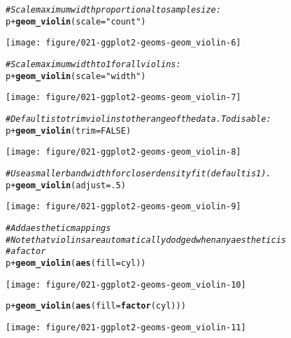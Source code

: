 \documentclass[a4paper,titlepage]{tufte-handout}\usepackage[]{graphicx}\usepackage[]{color}
\makeatletter
\def\maxwidth{ %
  \ifdim\Gin@nat@width>\linewidth
    \linewidth
  \else
    \Gin@nat@width
  \fi
}
\newcommand{\hlnum}[1]{\textcolor[rgb]{0.686,0.059,0.569}{#1}}%
\newcommand{\hlstr}[1]{\textcolor[rgb]{0.192,0.494,0.8}{#1}}%
\newcommand{\hlcom}[1]{\textcolor[rgb]{0.678,0.584,0.686}{\textit{#1}}}%
\newcommand{\hlopt}[1]{\textcolor[rgb]{0,0,0}{#1}}%
\newcommand{\hlstd}[1]{\textcolor[rgb]{0.345,0.345,0.345}{#1}}%
\newcommand{\hlkwc}[1]{\textcolor[rgb]{0.333,0.667,0.333}{#1}}%
\newcommand{\hlkwd}[1]{\textcolor[rgb]{0.737,0.353,0.396}{\textbf{#1}}}%
\newenvironment{kframe}{%
 \def\at@end@of@kframe{}%
 \ifinner\ifhmode%
  \def\at@end@of@kframe{\end{minipage}}%
  \begin{minipage}{\columnwidth}%
 \fi\fi%
 \def\FrameCommand##1{\hskip\@totalleftmargin \hskip-\fboxsep
 \colorbox{shadecolor}{##1}\hskip-\fboxsep
     \hskip-\linewidth \hskip-\@totalleftmargin \hskip\columnwidth}%
 \MakeFramed {\advance\hsize-\width
   \@totalleftmargin\z@ \linewidth\hsize
   \@setminipage}}%
 {\par\unskip\endMakeFramed%
 \at@end@of@kframe}
\newenvironment{knitrout}{}{} %
\makeatother
\begin{document}
\begin{knitrout}
\begin{kframe}
\begin{alltt}
\hlcom{# Scale maximum width proportional to sample size:}
\hlstd{p} \hlopt{+} \hlkwd{geom_violin}\hlstd{(}\hlkwc{scale} \hlstd{=} \hlstr{"count"}\hlstd{)}
\end{alltt}
\end{kframe}
\texttt{[image: figure/021-ggplot2-geoms-geom\_violin-6]} 
\begin{kframe}\begin{alltt}
\hlcom{# Scale maximum width to 1 for all violins:}
\hlstd{p} \hlopt{+} \hlkwd{geom_violin}\hlstd{(}\hlkwc{scale} \hlstd{=} \hlstr{"width"}\hlstd{)}
\end{alltt}
\end{kframe}
\texttt{[image: figure/021-ggplot2-geoms-geom\_violin-7]} 
\begin{kframe}\begin{alltt}
\hlcom{# Default is to trim violins to the range of the data. To disable:}
\hlstd{p} \hlopt{+} \hlkwd{geom_violin}\hlstd{(}\hlkwc{trim} \hlstd{=} \hlnum{FALSE}\hlstd{)}
\end{alltt}
\end{kframe}
\texttt{[image: figure/021-ggplot2-geoms-geom\_violin-8]} 
\begin{kframe}\begin{alltt}
\hlcom{# Use a smaller bandwidth for closer density fit (default is 1).}
\hlstd{p} \hlopt{+} \hlkwd{geom_violin}\hlstd{(}\hlkwc{adjust} \hlstd{=} \hlnum{.5}\hlstd{)}
\end{alltt}
\end{kframe}
\texttt{[image: figure/021-ggplot2-geoms-geom\_violin-9]} 
\begin{kframe}\begin{alltt}
\hlcom{# Add aesthetic mappings}
\hlcom{# Note that violins are automatically dodged when any aesthetic is}
\hlcom{# a factor}
\hlstd{p} \hlopt{+} \hlkwd{geom_violin}\hlstd{(}\hlkwd{aes}\hlstd{(}\hlkwc{fill} \hlstd{= cyl))}
\end{alltt}
\end{kframe}
\texttt{[image: figure/021-ggplot2-geoms-geom\_violin-10]} 
\begin{kframe}\begin{alltt}
\hlstd{p} \hlopt{+} \hlkwd{geom_violin}\hlstd{(}\hlkwd{aes}\hlstd{(}\hlkwc{fill} \hlstd{=} \hlkwd{factor}\hlstd{(cyl)))}
\end{alltt}
\end{kframe}
\texttt{[image: figure/021-ggplot2-geoms-geom\_violin-11]} 

\end{knitrout}
\end{document}
